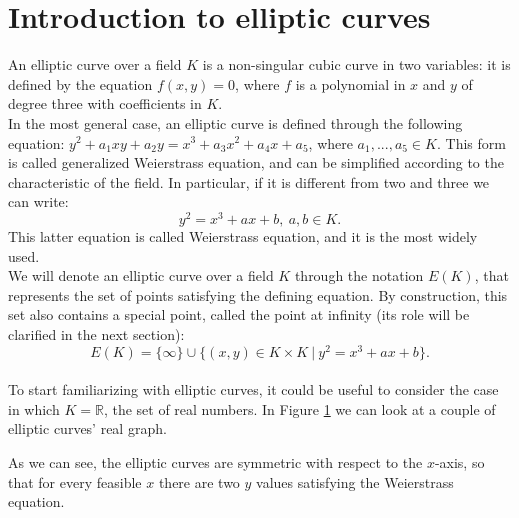 \section{Introduction to elliptic curves}
\label{chpr:ec}
An elliptic curve over a field $K$ is a non-singular cubic curve in two variables: it is defined by the equation $f(x, y) = 0$, where $f$ is a polynomial in $x$ and $y$ of degree three with coefficients in $K$.
\\
In the most general case, an elliptic curve is defined through the following equation: $y^2 + a_1xy + a_2y = x^3 + a_3x^2 + a_4x + a_5$, where $a_1, ..., a_5 \in K$. This form is called generalized Weierstrass equation, and can be simplified according to the characteristic of the field. In particular, if it is different from two and three we can write:
$$y^2 = x^3 + ax + b, \ a, b \in K.$$
This latter equation is called Weierstrass equation, and it is the most widely used.
\\
We will denote an elliptic curve over a field $K$ through the notation $E(K)$, that represents the set of points satisfying the defining equation. By construction, this set also contains a special point, called the point at infinity (its role will be clarified in the next section): 
$$E(K) = \{\infty\}\cup\{(x, y) \in K \times K \ | \ y^2 = x^3 + ax + b\}.$$
\\
To start familiarizing with elliptic curves, it could be useful to consider the case in which $K = \mathbb{R}$, the set of real numbers. In Figure \ref{fig:figure1} we can look at a couple of elliptic curves' real graph.
\begin{figure}
	\noindent
	\label{fig:figure1}
\end{figure}
\noindent
As we can see, the elliptic curves are symmetric with respect to the $x$-axis, so that for every feasible $x$ there are two $y$ values satisfying the Weierstrass equation.
